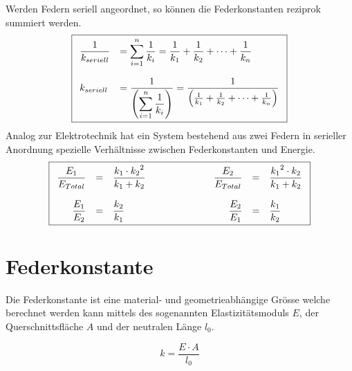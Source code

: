 \noindent
Werden Federn seriell angeordnet, so können die Federkonstanten reziprok 
summiert werden.
\[ \boxed{\begin{array}{l l}\displaystyle
	\frac{1}{k_{seriell}} 
		&= \displaystyle \sum_{i=1}^n \frac{1}{k_i} = 
		\displaystyle \frac{1}{k_1} + \frac{1}{k_2} 
			+ \dots + \frac{1}{k_n} \\
	& \\
	k_{seriell} 
		&= \displaystyle \frac{1}{\left( 
			\displaystyle \sum_{i=1}^n\frac{1}{k_i}\right)} 
		= \displaystyle \frac{1}{\left(
			\frac{1}{k_1} + \frac{1}{k_2} 
			+ \dots + \frac{1}{k_n} \right)}
\end{array}} \]
Analog zur Elektrotechnik hat ein System bestehend aus zwei Federn
in serieller Anordnung spezielle Verhältnisse zwischen Federkonstanten 
und Energie.
\[ \boxed{\begin{array}{r c l  r c l}
\displaystyle
\frac{E_1}{E_{Total}} 
	&=& \displaystyle \frac{k_1 \cdot {k_2}^2}{k_1 + k_2} 
	\qquad \qquad
	& \qquad \displaystyle \frac{E_2}{E_{Total}}
	&=& \displaystyle \frac{{k_1}^2 \cdot k_2}{k_1 + k_2} \\
 & & & & & \\
\displaystyle \frac{E_1}{E_2} 
	&=& \displaystyle \frac{k_2}{k_1} 
	\qquad \qquad
	& \qquad \displaystyle \frac{E_2}{E_1} 
	&=& 
	\displaystyle \frac{k_1}{k_2}
\end{array}} \]
\section{Federkonstante}
Die Federkonstante ist eine material- und geometrieabhängige Grösse welche
berechnet werden kann mittels des sogenannten Elastizitätsmoduls $E$, der
Querschnittsfläche $A$ und der neutralen Länge $l_0$.

\[ \boxed{k = \frac{E \cdot A}{l_0}} \]

